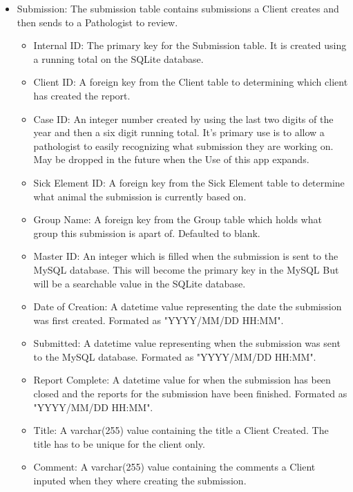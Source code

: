 \documentclass[onecolumn, draftclsnofoot,10pt, compsoc]{IEEEtran}
\begin{document}
\begin{itemize}
\item Submission:\newline
The submission table contains submissions a Client creates and then sends to a Pathologist to review.
\begin{itemize}
\item Internal ID: The primary key for the Submission table. It is created using a running total on the SQLite database.
\item Client ID: A foreign key from the Client table to determining which client has created the report.
\item Case ID: An integer number created by using the last two digits of the year and then a six digit running total. It's primary use is to allow a pathologist to easily recognizing what submission they are working on. May be dropped in the future when the Use of this app expands.  
\item Sick Element ID: A foreign key from the Sick Element table to determine what animal the submission is currently based on.
\item Group Name: A foreign key from the Group table which holds what group this submission is apart of. Defaulted to blank.
\item Master ID: An integer which is filled when the submission is sent to the MySQL database. This will become the primary key in the MySQL But will be a searchable value in the SQLite database.
\item Date of Creation: A datetime value representing the date the submission was first created. Formated as "YYYY/MM/DD HH:MM".
\item Submitted: A datetime value representing when the submission was sent to the MySQL database. Formated as "YYYY/MM/DD HH:MM".
\item Report Complete: A datetime value for when the submission has been closed and the reports for the submission have been finished. Formated as "YYYY/MM/DD HH:MM".
\item Title: A varchar(255) value containing the title a Client Created. The title has to be unique for the client only.
\item Comment: A varchar(255) value containing the comments a Client inputed when they where creating the submission.
\end{itemize}


\end{itemize}
\end{document}
